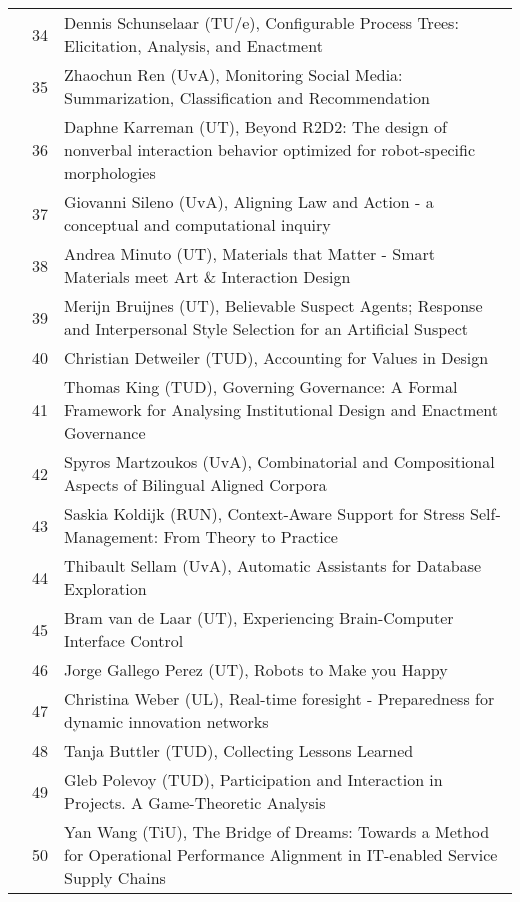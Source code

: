 \begin{xltabular}{\linewidth}{@{} l @{\hspace{0.5em}} l @{\hspace{1em}} X @{}}
	&	 34	&	 Dennis Schunselaar (TU/e), Configurable Process Trees: Elicitation, Analysis, and Enactment\\
	&	 35	&	 Zhaochun Ren (UvA), Monitoring Social Media: Summarization, Classification and Recommendation\\
	&	 36	&	 Daphne Karreman (UT), Beyond R2D2: The design of nonverbal interaction behavior optimized for robot-specific morphologies\\
	&	 37	&	 Giovanni Sileno (UvA), Aligning Law and Action - a conceptual and computational inquiry\\
	&	 38	&	 Andrea Minuto (UT), Materials that Matter - Smart Materials meet Art \& Interaction Design\\
	&	 39	&	 Merijn Bruijnes (UT), Believable Suspect Agents; Response and Interpersonal Style Selection for an Artificial Suspect\\
	&	 40	&	 Christian Detweiler (TUD), Accounting for Values in Design\\
	&	 41	&	 Thomas King (TUD), Governing Governance: A Formal Framework for Analysing Institutional Design and Enactment Governance\\
	&	 42	&	 Spyros Martzoukos (UvA), Combinatorial and Compositional Aspects of Bilingual Aligned Corpora\\
	&	 43	&	 Saskia Koldijk (RUN), Context-Aware Support for Stress Self-Management: From Theory to Practice\\
	&	 44	&	 Thibault Sellam (UvA), Automatic Assistants for Database Exploration\\
	&	 45	&	 Bram van de Laar (UT), Experiencing Brain-Computer Interface Control\\
	&	 46	&	 Jorge Gallego Perez (UT), Robots to Make you Happy\\
	&	 47	&	 Christina Weber (UL), Real-time foresight - Preparedness for dynamic innovation networks\\
	&	 48	&	 Tanja Buttler (TUD), Collecting Lessons Learned\\
	&	 49	&	 Gleb Polevoy (TUD), Participation and Interaction in Projects. A Game-Theoretic Analysis\\
	&	 50	&	 Yan Wang (TiU), The Bridge of Dreams: Towards a Method for Operational Performance Alignment in IT-enabled Service Supply Chains\\
	

\end{xltabular}
